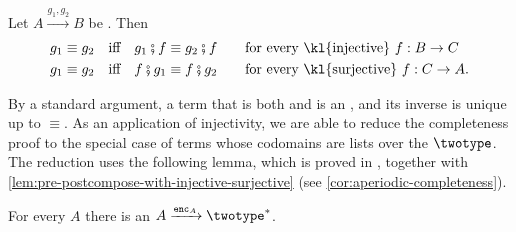 \begin{lemma}\label{lem:pre-postcompose-with-injective-surjective}
    Let $A \xrightarrow {g_1,g_2} B$ be . Then 
    \begin{align*}
g_1 \equiv g_2 \quad \text{iff} \quad g_1\comp{}f \equiv g_2\comp{}f \qquad &\text{for every \kl{injective} }f : B \to C \\ 
g_1 \equiv g_2 \quad \text{iff} \quad f\comp{}g_1 \equiv f\comp{}g_2 \qquad &\text{for every \kl{surjective}  }f : C \to A.
\end{align*}
\end{lemma}
By a standard argument, a term that is both  and  is an , and its inverse is unique up to $\equiv$. As an application of injectivity, we are able to reduce the completeness proof to the special case of terms whose codomains are lists over the  ${\twotype}$. The reduction uses the following lemma, which is proved in , together with \cref{lem:pre-postcompose-with-injective-surjective} (see \cref{cor:aperiodic-completeness}).

\begin{lemma}\label{lem:provably-injective-string-representation}
    For every  $A$ there is an   $A \xrightarrow{\stringrep{A}} {\twotype}^*$.
\end{lemma}
